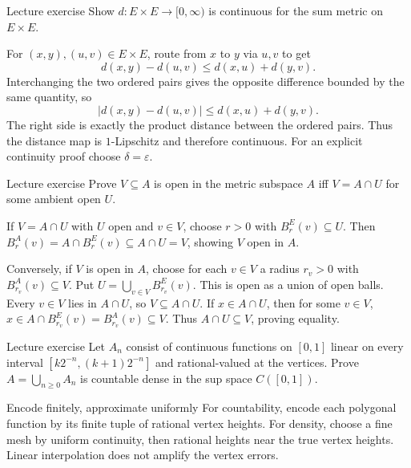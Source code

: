 \begin{exam}{Lecture exercise}
Show $d:E\times E\to[0,\infty)$ is continuous for the sum metric on $E\times E$.
\end{exam}
\begin{answer}
For $(x,y),(u,v)\in E\times E$, route from $x$ to $y$ via $u,v$ to get
\[d(x,y)-d(u,v)\le d(x,u)+d(y,v).\]
Interchanging the two ordered pairs gives the opposite difference bounded by the same quantity, so
\[|d(x,y)-d(u,v)|\le d(x,u)+d(y,v).\]
The right side is exactly the product distance between the ordered pairs. Thus the distance map is $1$-Lipschitz and therefore continuous. For an explicit continuity proof choose $\delta=\varepsilon$.
\end{answer}
\begin{exam}{Lecture exercise}
Prove $V\subseteq A$ is open in the metric subspace $A$ iff $V=A\cap U$ for some ambient open $U$.
\end{exam}
\begin{answer}
If $V=A\cap U$ with $U$ open and $v\in V$, choose $r>0$ with $B_r^E(v)\subseteq U$. Then $B_r^A(v)=A\cap B_r^E(v)\subseteq A\cap U=V$, showing $V$ open in $A$.

Conversely, if $V$ is open in $A$, choose for each $v\in V$ a radius $r_v>0$ with $B_{r_v}^A(v)\subseteq V$. Put $U=\bigcup_{v\in V}B_{r_v}^E(v)$. This is open as a union of open balls. Every $v\in V$ lies in $A\cap U$, so $V\subseteq A\cap U$. If $x\in A\cap U$, then for some $v\in V$, $x\in A\cap B_{r_v}^E(v)=B_{r_v}^A(v)\subseteq V$. Thus $A\cap U\subseteq V$, proving equality.
\end{answer}
\begin{exam}{Lecture exercise}
Let $A_n$ consist of continuous functions on $[0,1]$ linear on every interval $[k2^{-n},(k+1)2^{-n}]$ and rational-valued at the vertices. Prove $A=\bigcup_{n\ge0}A_n$ is countable dense in the sup space $C([0,1])$.
\end{exam}
\begin{method}{Encode finitely, approximate uniformly}
For countability, encode each polygonal function by its finite tuple of rational vertex heights. For density, choose a fine mesh by uniform continuity, then rational heights near the true vertex heights. Linear interpolation does not amplify the vertex errors.
\end{method}
